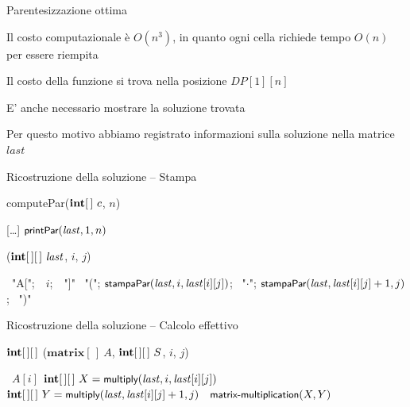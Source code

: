 \begin{frame}{Parentesizzazione ottima}

\vspace{-6pt}
\begin{myboxtitle}[Considerazioni]
\BIL
\item Il costo computazionale è $O(n^3)$, in quanto ogni cella richiede tempo $O(n)$ per essere riempita
\item Il costo della funzione si trova nella posizione $DP[1][n]$
\item E' anche necessario mostrare la soluzione trovata
\item Per questo motivo abbiamo registrato informazioni sulla soluzione nella matrice $\mathit{last}$
\EIL
\end{myboxtitle}

\end{frame}

\begin{frame}{Ricostruzione della soluzione -- Stampa}

\vspace{-6pt}
\begin{Procedure}
\caption[A]{\textsf{computePar}($\INTARRAY\ c$, \INTEGER $n$)}	
[\ldots]\;
$\textsf{{\small printPar}}(\mathit{last}, 1, n)$\;
\end{Procedure}


\begin{Procedure}
\caption[A]{($\INTARRAY[\,]\ \mathit{last}$, \INTEGER $i$, \INTEGER $j$)}
{ \PRINT\ "A[";\ \PRINT\ $i$;\ \PRINT\ "]"\; }
{
  \PRINT\ "("; 
  $\textsf{{\small stampaPar}}(\mathit{last}, i, \mathit{last}[i][j])$; 
  \PRINT\ "$\cdot$"; 
  $\textsf{{\small stampaPar}}(\mathit{last}, \mathit{last}[i][j]+1, j)$; 
  \PRINT\ ")"\;
}
\end{Procedure}

\end{frame}

\begin{frame}{Ricostruzione della soluzione -- Calcolo effettivo}

\vspace{-6pt}
\begin{Procedure}
\caption[A]{$\INTARRAY[\,]$ ($\mathbf{matrix}[\,]\ A$, $\INTARRAY[\,]\ S$, \INTEGER $i$, \INTEGER $j$)}
{ \Return\ $A[i]$\; }
{
  $\INTARRAY[\,]\ X = \fontproc{multiply}(\mathit{last}, i, \mathit{last}[i][j])$\;
  $\INTARRAY[\,]\ Y = \fontproc{multiply}(\mathit{last}, \mathit{last}[i][j]+1, j)$\;
  \Return\ $\textsf{{\small matrix-multiplication}}(X,Y)$\;
}
\end{Procedure}

\end{frame}

